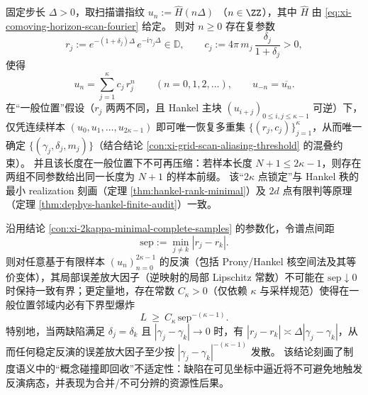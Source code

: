 \begin{proposition}\label{con:xi-2kappa-minimal-complete-samples}
固定步长 \(\Delta>0\)，取扫描谱指纹
\(
u_n:=\widehat H(n\Delta)
\)
（\(n\in\ZZ\)），其中 \(\widehat H\) 由 \eqref{eq:xi-comoving-horizon-scan-fourier} 给定。
则对 \(n\ge 0\) 存在复参数
\[
r_j:=e^{-(1+\delta_j)\Delta}\,e^{-\mathrm{i}\gamma_j\Delta}\in\mathbb{D},
\qquad
c_j:=4\pi\,m_j\,\frac{\delta_j}{1+\delta_j}>0,
\]
使得
\[
u_n=\sum_{j=1}^{\kappa}c_j\,r_j^{n}\qquad(n=0,1,2,\dots),
\qquad
u_{-n}=\overline{u_n}.
\]
在“一般位置”假设（\(r_j\) 两两不同，且 Hankel 主块 \((u_{i+j})_{0\le i,j\le \kappa-1}\) 可逆）下，仅凭连续样本
\(
(u_0,u_1,\dots,u_{2\kappa-1})
\)
即可唯一恢复多重集 \(\{(r_j,c_j)\}_{j=1}^{\kappa}\)，从而唯一确定 \(\{(\gamma_j,\delta_j,m_j)\}\)（结合结论 \ref{con:xi-grid-scan-aliasing-threshold} 的混叠约束）。
并且该长度在一般位置下不可再压缩：若样本长度 \(N+1\le 2\kappa-1\)，则存在两组不同参数给出同一长度为 \(N+1\) 的样本前缀。
该“\(2\kappa\) 点锁定”与 Hankel 秩的最小 realization 刻画（定理 \ref{thm:hankel-rank-minimal}）及 \(2d\) 点有限判等原理（定理 \ref{thm:dephys-hankel-finite-audit}）一致。
\end{proposition}








\begin{proposition}\label{con:xi-collision-illposedness-sep-blowup}
沿用结论 \ref{con:xi-2kappa-minimal-complete-samples} 的参数化，令谱点间距
\[
\mathrm{sep}:=\min_{j\neq k}|r_j-r_k|.
\]
则对任意基于有限样本 \((u_n)_{n=0}^{2\kappa-1}\) 的反演（包括 Prony/Hankel 核空间法及其等价变体），其局部误差放大因子（逆映射的局部 Lipschitz 常数）不可能在 \(\mathrm{sep}\downarrow 0\) 时保持一致有界；更定量地，存在常数 \(C_\kappa>0\)（仅依赖 \(\kappa\) 与采样规范）使得在一般位置邻域内必有下界型爆炸
\[
L\ \ge\ C_\kappa\,\mathrm{sep}^{-(\kappa-1)}.
\]
特别地，当两缺陷满足 \(\delta_j=\delta_k\) 且 \(|\gamma_j-\gamma_k|\to 0\) 时，有 \(|r_j-r_k|\asymp \Delta|\gamma_j-\gamma_k|\)，从而任何稳定反演的误差放大因子至少按 \(|\gamma_j-\gamma_k|^{-(\kappa-1)}\) 发散。
该结论刻画了制度语义中的“概念碰撞即回收”不适定性：缺陷在可见坐标中逼近将不可避免地触发反演病态，并表现为合并/不可分辨的资源性后果。
\end{proposition}

